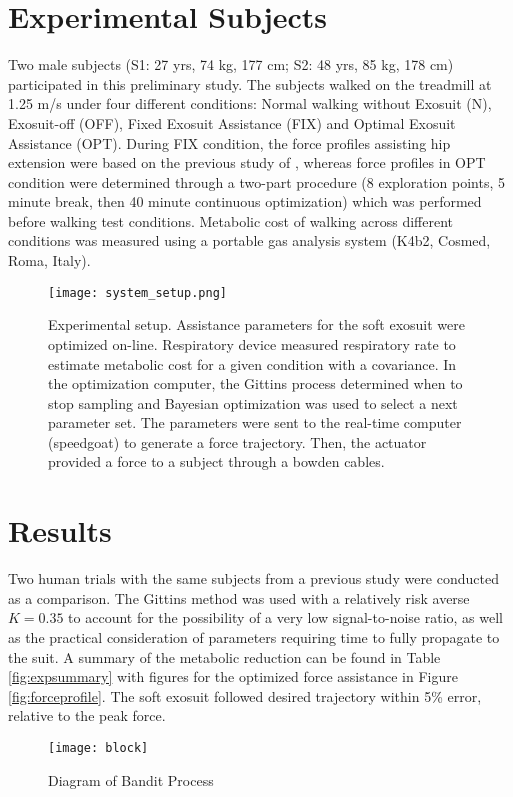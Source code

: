 \section{Experimental Subjects}
Two male subjects (S1: 27 yrs, 74 kg, 177 cm; S2: 48 yrs, 85 kg, 178 cm) participated in this preliminary study. The subjects walked on the treadmill at 1.25 m/s under four different conditions: Normal walking without Exosuit (N), Exosuit-off (OFF), Fixed Exosuit Assistance (FIX) and Optimal Exosuit Assistance (OPT). During FIX condition, the force profiles assisting hip extension were based on the previous study of \citep{Ding2016}, whereas force profiles in OPT condition were determined through a two-part procedure (8 exploration points, 5 minute break, then 40 minute continuous optimization) which was performed before walking test conditions. Metabolic cost of walking across different conditions was measured using a portable gas analysis system (K4b2, Cosmed, Roma, Italy).

\begin{figure}[t]
\centering
\texttt{[image: system\_setup.png]}
\caption{Experimental setup. Assistance parameters for the soft exosuit were optimized on-line. Respiratory device measured respiratory rate to estimate metabolic cost for a given condition with a covariance. In the optimization computer, the Gittins process determined when to stop sampling and Bayesian optimization was used to select a next parameter set. The parameters were sent to the real-time computer (speedgoat) to generate a force trajectory. Then, the actuator provided a force to a subject through a bowden cables. }
\label{fig:expsetup}
\end{figure}

\section{Results}
Two human trials with the same subjects from a previous study were conducted as a comparison. The Gittins method was used with a relatively risk averse $K=0.35$ to account for the possibility of a very low signal-to-noise ratio, as well as the practical consideration of parameters requiring time to fully propagate to the suit. A summary of the metabolic reduction can be found in Table \ref{fig:expsummary} with figures for the optimized force assistance in Figure \ref{fig:forceprofile}. The soft exosuit followed desired trajectory within 5\% error, relative to the peak force.

\begin{figure}[t]
\centering
\texttt{[image: block]}
\caption{Diagram of Bandit Process}
\label{fig:block}
\end{figure}

